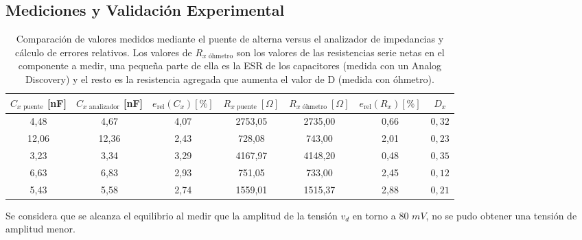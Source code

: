 \documentclass{article}
\begin{document}
\subsection{Mediciones y Validación Experimental}
\begin{table}[htbp]
\centering
\caption{Comparación de valores medidos mediante el puente de alterna versus el analizador de impedancias y cálculo de errores relativos. Los valores de $R_{x\text{ óhmetro}}$ son los valores de las resistencias serie netas en el componente a medir, una pequeña parte de ella es la ESR de los capacitores (medida con un Analog Discovery) y el resto es la resistencia agregada que aumenta el valor de D (medida con óhmetro).}
\label{tab:mediciones_errores}
\begin{tabular}{|c|c|c|c|c|c|c|}
\hline
\textbf{$C_{x\text{ puente}}$ [nF]} & \textbf{$C_{x\text{ analizador}}$ [nF]} & \textbf{$e_{\text{rel}} (C_x) [\%]$} & \textbf{$R_{x\text{ puente}} \ [\Omega]$} & \textbf{$R_{x\text{ óhmetro}} \ [\Omega]$} & \textbf{$e_{\text{rel}} (R_x) [\%]$} & \textbf{$D_{x}$} \\ \hline
4,48 & 4,67  & 4,07 & 2753,05 & 2735,00 & 0,66 & $0,32$ \\ \hline
12,06 & 12,36 & 2,43 & 728,08  & 743,00  & 2,01 & $0,23$ \\ \hline
3,23 & 3,34  & 3,29 & 4167,97 & 4148,20 & 0,48 & $0,35$ \\ \hline
6,63 & 6,83  & 2,93 & 751,05  & 733,00  & 2,45 & $0,12$ \\ \hline
5,43 & 5,58  & 2,74 & 1559,01 & 1515,37 & 2,88 & $0,21$ \\ \hline
\end{tabular}
\end{table}
Se considera que se alcanza el equilibrio al medir que la amplitud de la tensión $v_d$ en torno a 80 $mV$, no se pudo obtener una tensión de amplitud menor.
\end{document}
